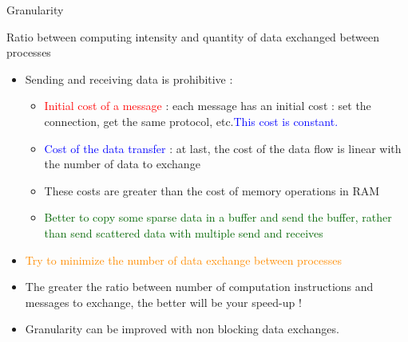 \documentclass[compress,10pt,aspectratio=169]{beamer}
\begin{document}
\begin{frame}[fragile]{Granularity}
    \scriptsize
    \begin{center}\small Ratio between computing intensity and quantity of data exchanged between processes\end{center}

    \begin{itemize}
        \item Sending and receiving data is prohibitive :
        \begin{itemize}
            \item {\scriptsize \textcolor{red}{Initial cost of a message} : each message has an initial cost : set the connection, 
                   get the same protocol, etc.\textcolor{blue}{This cost is constant.}} 
            \item {\scriptsize \textcolor{blue}{Cost of the data transfer} : at last, the cost of the data flow is linear with the number
            of data to exchange}
            \item {\scriptsize These costs are greater than the cost of memory operations in RAM}
            \item \textcolor{DarkGreen}{\scriptsize Better to copy some sparse data in a buffer and send the buffer, rather than send scattered data with multiple send and receives}
        \end{itemize}
        \item \textcolor{darkorange}{Try to minimize the number of data exchange between processes}
        \item The greater the ratio between number of computation instructions and messages to exchange, the better will be your speed-up !
        \item \alert{Granularity can be improved with non blocking data exchanges}.
    \end{itemize}
\end{frame}
\end{document}

